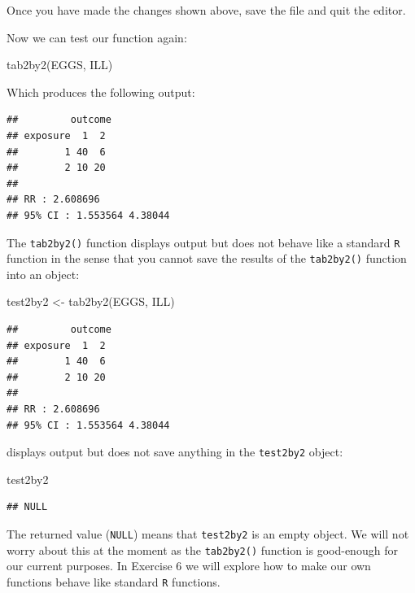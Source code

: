 \documentclass[
  12pt,
]{book}
\newenvironment{Shaded}{\begin{snugshade}}{\end{snugshade}}
\newcommand{\FunctionTok}[1]{\textcolor[rgb]{0.00,0.00,0.00}{#1}}
\newcommand{\NormalTok}[1]{#1}
\newcommand{\OtherTok}[1]{\textcolor[rgb]{0.56,0.35,0.01}{#1}}
\begin{document}
Once you have made the changes shown above, save the file and quit the editor.

\newpage

Now we can test our function again:

\begin{Shaded}
\begin{Highlighting}[]
\FunctionTok{tab2by2}\NormalTok{(EGGS, ILL)}
\end{Highlighting}
\end{Shaded}

Which produces the following output:

\begin{verbatim}
##         outcome
## exposure  1  2
##        1 40  6
##        2 10 20
## 
## RR : 2.608696 
## 95% CI : 1.553564 4.38044
\end{verbatim}

The \texttt{tab2by2()} function displays output but does not behave like a standard \texttt{R} function in the sense that you cannot save the results of the \texttt{tab2by2()} function into an object:

\begin{Shaded}
\begin{Highlighting}[]
\NormalTok{test2by2 }\OtherTok{\textless{}{-}} \FunctionTok{tab2by2}\NormalTok{(EGGS, ILL)}
\end{Highlighting}
\end{Shaded}

\begin{verbatim}
##         outcome
## exposure  1  2
##        1 40  6
##        2 10 20
## 
## RR : 2.608696 
## 95% CI : 1.553564 4.38044
\end{verbatim}

displays output but does not save anything in the \texttt{test2by2} object:

\begin{Shaded}
\begin{Highlighting}[]
\NormalTok{test2by2}
\end{Highlighting}
\end{Shaded}

\begin{verbatim}
## NULL
\end{verbatim}

\newpage

The returned value (\texttt{NULL}) means that \texttt{test2by2} is an empty object. We will not worry about this at the moment as the \texttt{tab2by2()} function is good-enough for our current purposes. In Exercise 6 we will explore how to make our own functions behave like standard \texttt{R} functions.
\end{document}
